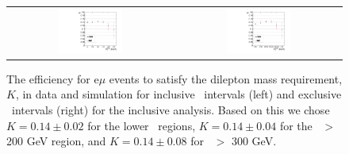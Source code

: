 \begin{figure}[!ht]
\begin{center}
\begin{tabular}{cc}
\includegraphics[width=0.4\textwidth]{plots/extractK_inclusive_19p5fb.pdf} &
\includegraphics[width=0.4\textwidth]{plots/extractK_exclusive_19p5fb.pdf} \\
\end{tabular}
\caption{\label{fig:K_incl}
The efficiency for e$\mu$ events to satisfy the dilepton mass requirement, $K$, in data and simulation for inclusive \MET\ intervals (left) and
exclusive \MET\ intervals (right) for the inclusive analysis. 
Based on this we chose $K=0.14\pm0.02$ for the lower \MET\ regions, $K=0.14\pm0.04$ for the \MET\ $>$ 200 GeV region, and $K=0.14\pm0.08$ for \MET\ $>$ 300 GeV.
}

\end{center}
\end{figure}

